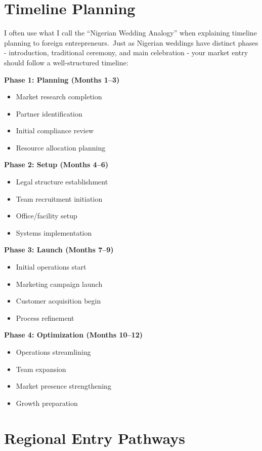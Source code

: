 \section{Timeline Planning}\label{sec:timeline-planning}

I often use what I call the ``Nigerian Wedding Analogy'' when explaining timeline planning to foreign entrepreneurs.\ Just as Nigerian weddings have distinct phases - introduction, traditional ceremony, and main celebration - your market entry should follow a well-structured timeline:

\textbf{Phase 1: Planning (Months 1--3)}
\begin{itemize}
    \item Market research completion
    \item Partner identification
    \item Initial compliance review
    \item Resource allocation planning
\end{itemize}
\vspace{1em}
\textbf{Phase 2: Setup (Months 4--6)}
\begin{itemize}
    \item Legal structure establishment
    \item Team recruitment initiation
    \item Office/facility setup
    \item Systems implementation
\end{itemize}
\vspace{1em}
\textbf{Phase 3: Launch (Months 7--9)}
\begin{itemize}
    \item Initial operations start
    \item Marketing campaign launch
    \item Customer acquisition begin
    \item Process refinement
\end{itemize}
\vspace{1em}
\textbf{Phase 4: Optimization (Months 10--12)}
\begin{itemize}
    \item Operations streamlining
    \item Team expansion
    \item Market presence strengthening
    \item Growth preparation
\end{itemize}
\section{Regional Entry Pathways}\label{sec:regional-market-entry-pathways}

